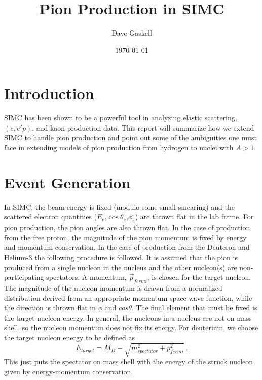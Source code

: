 
\title{Pion Production in SIMC}
\author{Dave Gaskell}
\date{\today}
\maketitle

\section{Introduction}
SIMC has been shown to be a powerful tool in analyzing elastic scattering,
$(e,e'p)$, and kaon production data.  This report will summarize how we extend
SIMC to handle pion production and point out some of the ambiguities one must 
face in extending models of pion production from hydrogen to nuclei with $A>1$.

\section{Event Generation}
In SIMC, the beam energy is fixed (modulo some small smearing) and the 
scattered electron quantities ($E_e$,$\cos{\theta_e}$,$\phi_e$) are thrown flat
in the lab frame.  For pion production, the pion angles are also thrown flat.
In the case of production from the free proton, the magnitude of the pion 
momentum is fixed by energy and momentum conservation.  In the case of 
production from the Deuteron and Helium-3 the following procedure is followed.
It is assumed that the pion is produced from a single nucleon in the nucleus 
and the other nucleon(s) are non-participating
spectators.  A momentum, $\vec{p}_{fermi}$, is chosen for the target nucleon.  
The magnitude of the nucleon momentum is drawn from a normalized distribution
derived from an appropriate momentum space wave function, while the direction
is thrown flat in $\phi$ and $cos{\theta}$.  The final element that must be
fixed is the target nucleon energy.  In general, the nucleons in a nucleus are
not on mass shell, so the nucleon momentum does not fix its energy.  For 
deuterium, we choose the target nucleon energy to be defined as
$$
E_{target} = M_{D} - \sqrt{m_{spectator}^2+p^2_{fermi}} \:.
$$
This just puts the spectator on mass shell with the energy of the struck
nucleon given by energy-momentum conservation.  

